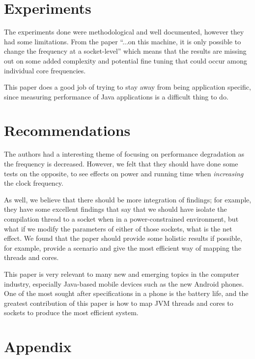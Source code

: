 \documentclass[conference]{IEEEtran}
\begin{document}
\section{Experiments}

The experiments done were methodological and well documented, however they had some limitations.  From the paper ``...on this machine, it is only possible to change the frequency at a socket-level'' which means that the results are missing out on some added complexity and potential fine tuning that could occur among individual core frequencies.

This paper does a good job of trying to stay away from being application specific, since measuring performance of Java applications is a difficult thing to do. 

\section{Recommendations}
The authors had a interesting theme of focusing on performance degradation as the frequency is decreased.  However, we felt that they should have done some tests on the opposite, to see effects on power and running time when \emph{increasing} the clock frequency.  

As well, we believe that there should be more integration of findings; for example, they have some excellent findings that say that we should have isolate the compilation thread to a socket when in a power-constrained environment, but what if we modify the parameters of either of those sockets, what is the net effect.  We found that the paper should provide some holistic results if possible, for example, provide a scenario and give the most efficient way of mapping the threads and cores.

This paper is very relevant to many new and emerging topics in the computer industry, especially Java-based mobile devices such as the new Android phones.  One of the most sought after specifications in a phone is the battery life, and the greatest contribution of this paper is how to map JVM threads and cores to sockets to produce the most efficient system.

\section{Appendix}

\end{document}

